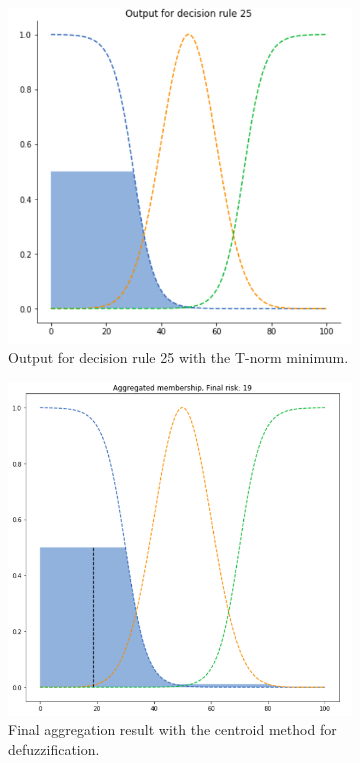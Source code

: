 \begin{figure}[ht]
\begin{subfigure}{.5\textwidth}
  \centering
  \includegraphics[width=.8\linewidth]{figures/first/min3.png}  
  \caption{Output for decision rule 25 with the T-norm minimum.}
  \label{fig:1min3}
\end{subfigure}
\begin{subfigure}{.5\textwidth}
  \centering
  \includegraphics[width=.8\linewidth]{figures/first/min-centroid.png}  
  \caption{Final aggregation result with the centroid method for defuzzification.}
  \label{fig:1min-centroid}
\end{subfigure}
\begin{subfigure}{.5\textwidth}

\end{subfigure}
\end{figure}
